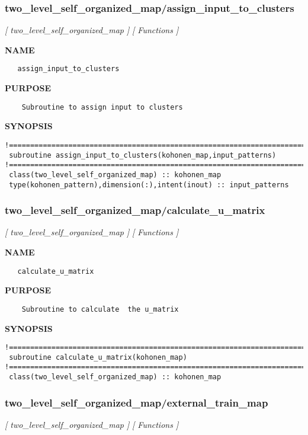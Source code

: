 \documentclass{article}
\begin{document}
\subsubsection{two\_level\_self\_organized\_map/assign\_input\_to\_clusters}
\textsl{[ two\_level\_self\_organized\_map ]}
\textsl{[ Functions ]}

\label{ch:robo57}
\label{ch:two_level_self_organized_map_assign_input_to_clusters}
\textbf{NAME}
\begin{verbatim}
   assign_input_to_clusters
\end{verbatim}
\textbf{PURPOSE}
\begin{verbatim}
    Subroutine to assign input to clusters
\end{verbatim}
\textbf{SYNOPSIS}
\begin{verbatim}
!======================================================================================== 
 subroutine assign_input_to_clusters(kohonen_map,input_patterns)
!========================================================================================
 class(two_level_self_organized_map) :: kohonen_map
 type(kohonen_pattern),dimension(:),intent(inout) :: input_patterns
\end{verbatim}
\newpage
\subsubsection{two\_level\_self\_organized\_map/calculate\_u\_matrix}
\textsl{[ two\_level\_self\_organized\_map ]}
\textsl{[ Functions ]}

\label{ch:robo58}
\label{ch:two_level_self_organized_map_calculate_u_matrix}
\textbf{NAME}
\begin{verbatim}
   calculate_u_matrix
\end{verbatim}
\textbf{PURPOSE}
\begin{verbatim}
    Subroutine to calculate  the u_matrix
\end{verbatim}
\textbf{SYNOPSIS}
\begin{verbatim}
!========================================================================================
 subroutine calculate_u_matrix(kohonen_map)
!========================================================================================
 class(two_level_self_organized_map) :: kohonen_map
\end{verbatim}
\newpage
\subsubsection{two\_level\_self\_organized\_map/external\_train\_map}
\textsl{[ two\_level\_self\_organized\_map ]}
\textsl{[ Functions ]}
\end{document}
